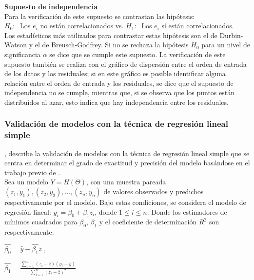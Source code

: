 \textbf{Supuesto de independencia}\\

Para la verificación de este supuesto se contrastan las hipótesis:\\

$H_0:\;$ Los $e_i$ no están correlacionados vs. $H_1:\;$ Los $e_i$ sí están correlacionados.\\

Los estadísticos más utilizados para contrastar estas hipótesis son el de Durbin-Watson y el de Breusch-Godfrey. Si no se rechaza la hipótesis $H_0$ para un nivel de significancia $\alpha$ se dice que se cumple este supuesto. La verificación de este supuesto también se realiza con el gráfico de dispersión entre el orden de entrada de los datos y los residuales; si en este gráfico es posible identificar alguna relación entre el orden de entrada y los residuales, se dice que el supuesto de independencia no se cumple, mientras que, si se observa que los puntos están distribuidos al azar, esto indica que hay independencia entre los residuales.


\subsubsection{Validación de modelos con la técnica de regresión lineal simple \parencite{febles-2014}}

\textcite{febles-2014}, describe la validación de modelos con la técnica de regresión lineal simple que se centra en determinar el grado de exactitud y precisión del modelo basándose en el trabajo previo de \textcite{balam-2012}.\\

Sea un modelo $Y = H(\Theta )$, con una muestra pareada $(z_{1}, y_{1}), (z_{2}, y_{2}) , \dots , (z_{n}, y_{n})$ de valores observados y predichos respectivamente por el modelo. Bajo estas condiciones, se considera el modelo de regresión lineal: $y_{i}= \beta_{0} + \beta_{1}z_{i}$, donde $ 1 \leq i \leq n$. Donde  los estimadores de mínimos cuadrados para $\beta_{0}$,  $\beta_{1}$ y el coeficiente de determinación $R^{2}$ son respectivamente: \\

\begin{center}
{\large$\hat{\beta_{0}} = \hat{y} - \hat{\beta_{1}} \bar{z}$} ,\\
\end{center}

\begin{center}
{\Large$ \hat{\beta_{1}} = \frac{\sum_{i=1}^{n} (z_{i} - \bar{z} ) (y_{i} - \bar{y})} {  \sum_{i=1}^{n} (z_{i} - \bar{z} )^{2} }$} \\
\end{center}

